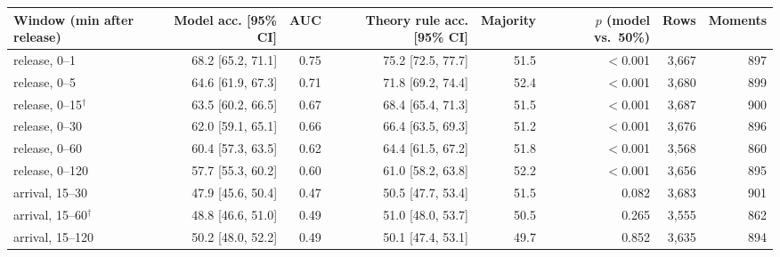 \begin{tabular}{lrrrrrrr}
\toprule
Window (min after release) & Model acc. [95\% CI] & AUC & Theory rule acc. [95\% CI] & Majority & $p$ (model vs.\ 50\%) & Rows & Moments \\
\midrule
release, 0--1 & 68.2 [65.2, 71.1] & 0.75 & 75.2 [72.5, 77.7] & 51.5 & $<$0.001 & 3,667 & 897 \\
release, 0--5 & 64.6 [61.9, 67.3] & 0.71 & 71.8 [69.2, 74.4] & 52.4 & $<$0.001 & 3,680 & 899 \\
release, 0--15$^\dagger$ & 63.5 [60.2, 66.5] & 0.67 & 68.4 [65.4, 71.3] & 51.5 & $<$0.001 & 3,687 & 900 \\
release, 0--30 & 62.0 [59.1, 65.1] & 0.66 & 66.4 [63.5, 69.3] & 51.2 & $<$0.001 & 3,676 & 896 \\
release, 0--60 & 60.4 [57.3, 63.5] & 0.62 & 64.4 [61.5, 67.2] & 51.8 & $<$0.001 & 3,568 & 860 \\
release, 0--120 & 57.7 [55.3, 60.2] & 0.60 & 61.0 [58.2, 63.8] & 52.2 & $<$0.001 & 3,656 & 895 \\
\midrule
arrival, 15--30 & 47.9 [45.6, 50.4] & 0.47 & 50.5 [47.7, 53.4] & 51.5 & 0.082 & 3,683 & 901 \\
arrival, 15--60$^\dagger$ & 48.8 [46.6, 51.0] & 0.49 & 51.0 [48.0, 53.7] & 50.5 & 0.265 & 3,555 & 862 \\
arrival, 15--120 & 50.2 [48.0, 52.2] & 0.49 & 50.1 [47.4, 53.1] & 49.7 & 0.852 & 3,635 & 894 \\
\bottomrule
\end{tabular}
